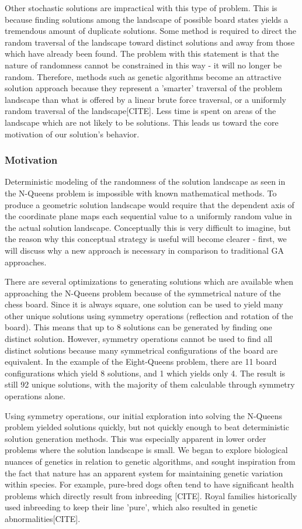 \documentclass{sig-alternate}
\begin{document}
Other stochastic solutions are impractical with this type of problem. This is because finding solutions among the landscape of possible board states yields a tremendous amount of duplicate solutions. Some method is required to direct the random traversal of the landscape toward distinct solutions and away from those which have already been found. The problem with this statement is that the nature of randomness cannot be constrained in this way - it will no longer be random. Therefore, methods such as genetic algorithms become an attractive solution approach  because they represent a 'smarter' traversal of the problem landscape than what is offered by a linear brute force traversal, or a uniformly random traversal of the landscape[CITE]. Less time is spent on areas of the landscape which are not likely to be solutions. This leads us toward the core motivation of our solution's behavior.

\subsubsection{Motivation}\label{motivation_section}
Deterministic modeling of the randomness of the solution landscape as seen in the N-Queens problem is impossible with known mathematical methods. To produce a geometric solution landscape would require that the dependent axis of the coordinate plane maps each sequential value to a uniformly random value in the actual solution landscape. Conceptually this is very difficult to imagine, but the reason why this conceptual strategy is useful will become clearer - first, we will discuss why a new approach is necessary in comparison to traditional GA approaches.

There are several optimizations to generating solutions which are available when approaching the N-Queens problem because of the symmetrical nature of the chess board. Since it is always square, one solution can be used to yield many other unique solutions using symmetry operations (reflection and rotation of the board). This means that up to 8 solutions can be generated by finding one distinct solution. However, symmetry operations cannot be used to find all distinct solutions because many symmetrical configurations of the board are equivalent. In the example of the Eight-Queens problem, there are 11 board configurations which yield 8 solutions, and 1 which yields only 4. The result is still 92 unique solutions, with the majority of them calculable through symmetry operations alone.

Using symmetry operations, our initial exploration into solving the N-Queens problem yielded solutions quickly, but not quickly enough to beat deterministic solution generation methods. This was especially apparent in lower order problems where the solution landscape is small. We began to explore biological nuances of genetics in relation to genetic algorithms, and sought inspiration from the fact that nature has an apparent system for maintaining genetic variation within species. For example, pure-bred dogs often tend to have significant health problems which directly result from inbreeding [CITE]. Royal families historically used inbreeding to keep their line 'pure', which also resulted in genetic abnormalities[CITE].
\end{document}
